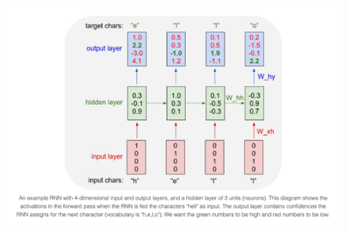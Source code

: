 \documentclass[10pt,twocolumn]{article}
\begin{document}
\begin{figure}[!ht]
    \centering
    \includegraphics[scale=0.25]{figures/char-rnn.png}
    \label{fig:char-rnn-arch}
\end{figure}
\end{document}
